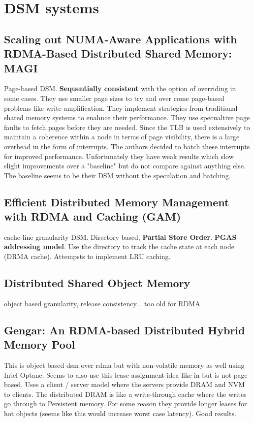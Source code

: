 \documentclass[sigplan,nonacm]{acmart}
\begin{document}
\section {DSM systems}

    \subsection{Scaling out NUMA-Aware Applications with RDMA-Based Distributed Shared Memory: MAGI}
    Page-based DSM. \textbf{Sequentially consistent} with the option of overriding in some cases. They use 
    smaller page sizes to try and over come page-based problems like write-amplification. They implement 
    strategies from traditional shared memory systems to enahnce their performance. They use specualtive 
    page faults to fetch pages before they are needed. Since the TLB is used extensively to maintain 
    a coherence within a node in terms of page visibility, there is a large overhead in the form of interrupts.
    The authors decided to batch these interrupts for improved performance. Unfortunately they have weak results
    which slow slight improvements over a "baseline" but do not compare against anything else. The baseline seems to be 
    their DSM without the speculation and batching.\cite{Hong-JCST-2019}

    \subsection{Efficient Distributed Memory Management with RDMA and Caching (GAM) }
    cache-line granularity DSM. Directory based, \textbf{Partial Store Order}. \textbf{PGAS addressing model}. 
    Use the directory to track the cache state at each node (DRMA cache). Attempsts to implement LRU 
    caching.  \cite{Cai-VLDB-2018}

    \subsection{Distributed Shared Object Memory}
    object based granularity, release consistency... too old for RDMA\cite{Guedes-WWOSIII-1993} %

    \subsection{Gengar: An RDMA-based Distributed Hybrid Memory Pool}
    This is object based dsm over rdma but with non-volatile memory as well using Intel Optane. Seems to 
    also use this lease assignment idea like in \cite{Endo-IPDRM-2020} but is not page based. Uses a client / 
    server model where the servers provide DRAM and NVM to clients. The distributed DRAM is like a write-through 
    cache where the writes go through to Persistent memory. For some reason they provide longer leases 
    for hot objects (seems like this would increase worst case latency). Good results. \cite{Duan-ICDCS-2021}
\end{document}
